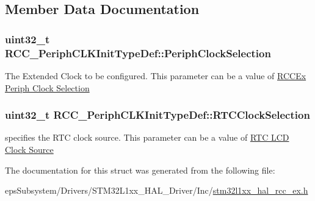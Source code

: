 \subsection{Member Data Documentation}
\hypertarget{struct_r_c_c___periph_c_l_k_init_type_def_a1fe6e3d75864d85b911eef15dfc35925}{
\subsubsection[{Periph\-Clock\-Selection}]{\setlength{\rightskip}{0pt plus 5cm}uint32\-\_\-t R\-C\-C\-\_\-\-Periph\-C\-L\-K\-Init\-Type\-Def\-::\-Periph\-Clock\-Selection}}\label{struct_r_c_c___periph_c_l_k_init_type_def_a1fe6e3d75864d85b911eef15dfc35925}
The Extended Clock to be configured. This parameter can be a value of \hyperlink{group___r_c_c_ex___periph___clock___selection}{R\-C\-C\-Ex Periph Clock Selection} \hypertarget{struct_r_c_c___periph_c_l_k_init_type_def_ad2c422d62b056a61d7bbb599c89dbc1e}{
\subsubsection[{R\-T\-C\-Clock\-Selection}]{\setlength{\rightskip}{0pt plus 5cm}uint32\-\_\-t R\-C\-C\-\_\-\-Periph\-C\-L\-K\-Init\-Type\-Def\-::\-R\-T\-C\-Clock\-Selection}}\label{struct_r_c_c___periph_c_l_k_init_type_def_ad2c422d62b056a61d7bbb599c89dbc1e}
specifies the R\-T\-C clock source. This parameter can be a value of \hyperlink{group___r_c_c___r_t_c___l_c_d___clock___source}{R\-T\-C L\-C\-D Clock Source} 

The documentation for this struct was generated from the following file\-:\begin{DoxyCompactItemize}
\item 
eps\-Subsystem/\-Drivers/\-S\-T\-M32\-L1xx\-\_\-\-H\-A\-L\-\_\-\-Driver/\-Inc/\hyperlink{stm32l1xx__hal__rcc__ex_8h}{stm32l1xx\-\_\-hal\-\_\-rcc\-\_\-ex.\-h}\end{DoxyCompactItemize}
